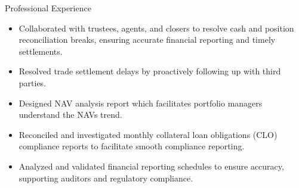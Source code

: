 \documentclass{resume}
\begin{document}
\begin{experienceSection}{Professional Experience}
       \experienceItem[
        position={Bank Loans Analyst},
        location={Telangana, India},
        company={Invesco},
        duration={Sep 2015 – May 2018}
    ]
    \begin{itemize}
        \itemsep -6pt {}
        \item Collaborated with trustees, agents, and closers to resolve cash and position reconciliation breaks, ensuring accurate financial reporting and timely settlements.
        \item Resolved trade settlement delays by proactively following up with third parties.
        \item Designed NAV analysis report which facilitates portfolio managers understand the NAVs trend.
        \item Reconciled and investigated monthly collateral loan obligations (CLO) compliance reports to facilitate smooth compliance reporting.
        \item Analyzed and validated financial reporting schedules to ensure accuracy, supporting auditors and regulatory compliance.

        
    \end{itemize}

\end{experienceSection}
\end{document}
